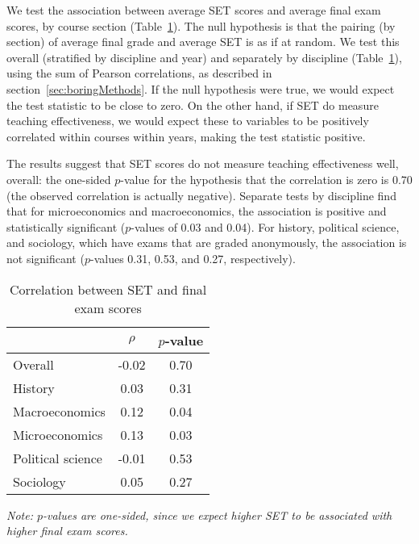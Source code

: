 \documentclass[12pt]{article}
\begin{document}
We test the association between average SET scores and average final exam scores, by course
section (Table~\ref{tab:finalexam}). 
The null hypothesis is that the pairing (by section)
of average final grade and average SET is as if at random.
We test this overall (stratified by discipline and year) and separately
by discipline (Table~\ref{tab:finalexam}), using the sum of Pearson correlations, as described 
in section~\ref{sec:boringMethods}.
If the null hypothesis were true, we would expect the test statistic to be 
close to zero.
On the other hand, if SET do measure teaching effectiveness, we would expect these to 
variables to be positively correlated within courses within years, making the
test statistic positive. 

The results suggest that SET scores do not measure teaching effectiveness well, overall:
the one-sided $p$-value for the hypothesis that the correlation is zero is 0.70 (the
observed correlation is actually negative). 
Separate tests by discipline find that for microeconomics and macroeconomics, the 
association is positive and statistically
significant ($p$-values of 0.03 and 0.04). 
For history, political science, and sociology, which have exams that are graded anonymously,
the association is not significant ($p$-values 0.31, 0.53, and 0.27, respectively). 

\begin{table}[htbp]
  \centering
  \footnotesize 
  \caption{Correlation between SET and final exam scores}
    \begin{tabular}{lcc}
    \toprule 
                        & $\rho$  & $p$-value  \\
   \midrule
    Overall &            -0.02 &       0.70  \\
    History &             0.03 &       0.31  \\
    Macroeconomics &      0.12 &       0.04  \\
    Microeconomics &      0.13 &       0.03  \\
    Political science &  -0.01 &       0.53  \\
    Sociology &           0.05 &       0.27  \\
    \bottomrule
    \end{tabular}%
 \label{tab:finalexam}%
 
\textit{Note: $p$-values are one-sided, since we expect higher SET to be associated
with higher final exam scores.}
\end{table}%
\normalsize
\end{document}
